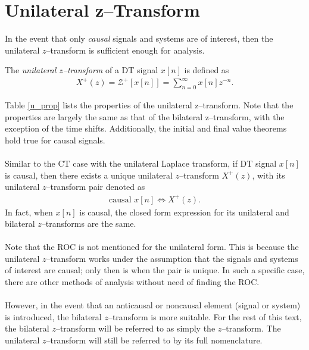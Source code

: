 \documentclass{report}
\begin{document}
\pagebreak
\section{Unilateral z--Transform}
In the event that only \emph{causal} signals and systems are of interest, then the unilateral $z$--transform is sufficient enough for analysis.
\begin{tcolorbox}[width=\textwidth,colback={white}, sharp corners]
    The \emph{unilateral $z$--transform} of a DT signal $x[n]$ is defined as  
    \begin{align}
        X^+(z) = \mathcal{Z}^+[x[n]] = \sum_{n=0}^{\infty} x[n] z^{-n}.
    \end{align}
\end{tcolorbox}

Table \ref{u_prop} lists the properties of the unilateral z--transform. Note that the properties are largely the same as that of the bilateral z--transform, 
with the exception of the time shifts. Additionally, the initial and final value theorems hold true for causal signals.
\\ \\ 
Similar to the CT case with the unilateral Laplace transform, if DT signal $x[n]$ is causal, then there exists a unique unilateral $z$--transform $X^+(z)$, with its 
unilateral $z$--transform pair denoted as
\begin{align}
    \text{causal }x[n] \iff X^+(z).
\end{align}
In fact, when $x[n]$ is causal, the closed form expression for its unilateral and bilateral $z$--transforms are the same. 
\\ \\ 
Note that the ROC is not mentioned for the unilateral form. This is because the unilateral $z$--transform works under the assumption that the signals and systems of interest are causal; only then 
is when the pair is unique. In such a specific case, there are other methods of analysis without need of finding the ROC.
\\ \\
However, in the event that an anticausal or noncausal element (signal or system) is introduced, the bilateral $z$--transform is more suitable. For the rest of this text, 
the bilateral $z$--transform will be referred to as simply the $z$--transform. The unilateral $z$--transform will still be referred to by its full nomenclature.
\end{document}
